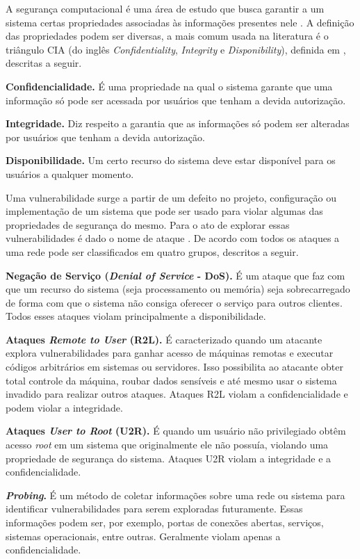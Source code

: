 A segurança computacional é uma área de estudo que busca garantir a um sistema certas propriedades associadas às informações presentes nele \citep{maziero2020, anderson2020security}. A definição das propriedades podem ser diversas, a mais comum usada na literatura é o triângulo CIA (do inglês \textit{Confidentiality}, \textit{Integrity} e \textit{Disponibility}), definida em \cite{Amoroso94}, descritas a seguir.

\textbf{Confidencialidade.} É uma propriedade na qual o sistema garante que uma informação só pode ser acessada por usuários que tenham a devida autorização.

\textbf{Integridade.} Diz respeito a garantia que as informações só podem ser alteradas por usuários que tenham a devida autorização.

\textbf{Disponibilidade.} Um certo recurso do sistema deve estar disponível para os usuários a qualquer momento.

Uma vulnerabilidade surge a partir de um defeito no projeto, configuração ou implementação de um sistema que pode ser usado para violar algumas das propriedades de segurança do mesmo. Para o ato de explorar essas vulnerabilidades é dado o nome de ataque \cite{anderson2020security}. De acordo com \cite{Tiwari2022} todos os ataques a uma rede pode ser classificados em quatro grupos, descritos a seguir.

\textbf{Negação de Serviço (\textit{Denial of Service} - DoS).} É um ataque que faz com que um recurso do sistema (seja processamento ou memória) seja sobrecarregado de forma com que o sistema não consiga oferecer o serviço para outros clientes. Todos esses ataques violam principalmente a disponibilidade.

\textbf{Ataques \textit{Remote to User} (R2L).} É caracterizado quando um atacante explora vulnerabilidades para ganhar acesso de máquinas remotas e executar códigos arbitrários em sistemas ou servidores. Isso possibilita ao atacante obter total controle da máquina, roubar dados sensíveis e até mesmo usar o sistema invadido para realizar outros ataques. Ataques R2L violam a confidencialidade e podem violar a integridade.

\textbf{Ataques \textit{User to Root} (U2R).} É quando um usuário não privilegiado obtêm acesso \textit{root} em um sistema que originalmente ele não possuía, violando uma propriedade de segurança do sistema. Ataques U2R violam a integridade e a confidencialidade.

\textbf{\textit{Probing}.} É um método de coletar informações sobre uma rede ou sistema para identificar vulnerabilidades para serem exploradas futuramente. Essas informações podem ser, por exemplo, portas de conexões abertas, serviços, sistemas operacionais, entre outras. Geralmente violam apenas a confidencialidade.

